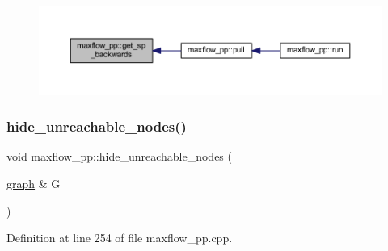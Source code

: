 \begin{figure}[H]
\begin{center}
\leavevmode
\includegraphics[width=350pt]{classmaxflow__pp_a58b7af1b215766e99adcca0994ecfb7a_icgraph}
\end{center}
\end{figure}
\mbox{\label{classmaxflow__pp_a93bb037fd3fc83c6558b560fc4da2340}} 
\subsubsection{\texorpdfstring{hide\+\_\+unreachable\+\_\+nodes()}{hide\_unreachable\_nodes()}}
{\footnotesize\ttfamily void maxflow\+\_\+pp\+::hide\+\_\+unreachable\+\_\+nodes (\begin{DoxyParamCaption}\item[{\mbox{\hyperlink{classgraph}{graph}} \&}]{G }\end{DoxyParamCaption})\hspace{0.3cm}{\ttfamily [protected]}}



Definition at line 254 of file maxflow\+\_\+pp.\+cpp.


